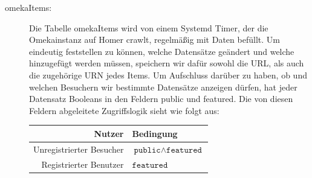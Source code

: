 \documentclass{article}
\begin{document}
\begin{description}
\item[omekaItems:]
    Die Tabelle omekaItems wird von einem Systemd Timer,
    der die Omekainstanz auf Homer crawlt,
    regelmäßig mit Daten befüllt.
    Um eindeutig feststellen zu können,
    welche Datensätze geändert und welche hinzugefügt werden müssen,
    speichern wir dafür sowohl die URL,
    als auch die zugehörige URN jedes Items.
    Um Aufschluss darüber zu haben,
    ob und welchen Besuchern wir bestimmte Datensätze anzeigen dürfen,
    hat jeder Datensatz Booleans in den Feldern public und featured.
    Die von diesen Feldern abgeleitete Zugriffslogik sieht wie folgt aus:

    \begin{tabular}{r|l}
    Nutzer & Bedingung\\\hline
    Unregistrierter Besucher & $\texttt{public}\land\texttt{featured}$\\
    Registrierter Benutzer & $\texttt{featured}$
    \end{tabular}


\end{description}
\end{document}
